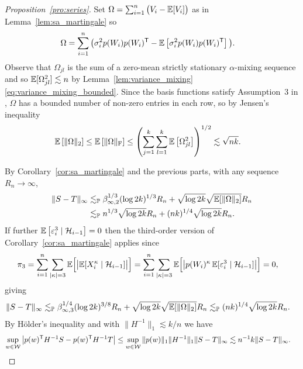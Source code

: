 \begin{proof}[Proposition~\ref{pro:series}]
  Set $\Omega = \sum_{i=1}^n \big(V_i - \mathbb{E}[V_i] \big)$ as in
  Lemma~\ref{lem:sa_martingale} so
  \begin{align*}
    \Omega
    &= \sum_{i=1}^n
    \big(\sigma_i^2 p(W_i)p(W_i)^{\mathsf{T}} - \mathbb{E}\left[ \sigma_i^2 p(W_i)p(W_i)^{\mathsf{T}}
    \right]\big).
  \end{align*}
  Observe that $\Omega_{j l}$ is the sum of a zero-mean
  strictly stationary $\alpha$-mixing sequence and so $\mathbb{E}[\Omega_{j l}^2]
  \lesssim n$ by
  Lemma~\ref{lem:variance_mixing}\ref{eq:variance_mixing_bounded}.
  Since the basis functions
  satisfy Assumption~3 in \citet{cattaneo2020large}, $\Omega$ has a bounded
  number of non-zero entries in each row, so by Jensen's inequality
  \begin{align*}
    \mathbb{E}\left[
      \|\Omega\|_2
    \right]
    &\leq
    \mathbb{E}\left[
      \|\Omega\|_{\mathrm{F}}
    \right]
    \leq
    \left(
      \sum_{j=1}^k
      \sum_{l=1}^k
      \mathbb{E}\left[
        \Omega_{j l}^2
      \right]
    \right)^{1/2}
    \lesssim \sqrt{n k}.
  \end{align*}


  By Corollary~\ref{cor:sa_martingale} and the previous parts,
  with any sequence $R_n \to \infty$,
  \begin{align*}
    \|S  - T \|_\infty
    &\lesssim_{\mathbb{P}}
    \beta_{\infty,2}^{1/3} (\log 2k)^{1/3} R_n
    + \sqrt{\log 2k} \sqrt{\mathbb{E}[\|\Omega\|_2]} R_n \\
    &\lesssim_{\mathbb{P}}
    n^{1/3} \sqrt{\log 2k} R_n
    + (n k)^{1/4} \sqrt{\log 2k} R_n.
  \end{align*}
  If further $\mathbb{E} \left[ \varepsilon_i^3 \mid \mathcal{H}_{i-1} \right] = 0$ then
  the third-order version of Corollary~\ref{cor:sa_martingale}
  applies since
  \begin{align*}
    \pi_3
    &=
    \sum_{i=1}^{n}
    \sum_{|\kappa| = 3}
    \mathbb{E} \Big[ \big|
      \mathbb{E} [ X_i^\kappa \mid \mathcal{H}_{i-1} ]
    \big| \Big]
    =
    \sum_{i=1}^{n}
    \sum_{|\kappa| = 3}
    \mathbb{E} \Big[ \big|
      p(W_i)^\kappa \,
      \mathbb{E} [ \varepsilon_i^3 \mid \mathcal{H}_{i-1} ]
    \big| \Big]
    = 0,
  \end{align*}
  giving
  \begin{align*}
    \|S  - T \|_\infty
    &\lesssim_{\mathbb{P}}
    \beta_{\infty,3}^{1/4} (\log 2k)^{3/8} R_n
    + \sqrt{\log 2k} \sqrt{\mathbb{E}[\|\Omega\|_2]} R_n
    \lesssim_{\mathbb{P}}
    (n k)^{1/4} \sqrt{\log 2k} R_n.
  \end{align*}
  By H{\"o}lder's inequality and with
  $\|H^{-1}\|_1 \lesssim k/n$ we have
  \begin{align*}
    \sup_{w \in \mathcal{W}}
    \left|
    p(w)^{\mathsf{T}} H^{-1} S
    - p(w)^{\mathsf{T}} H^{-1} T
    \right|
    &\leq
    \sup_{w \in \mathcal{W}}
    \|p(w)\|_1
    \|H^{-1}\|_1
    \| S - T \|_\infty
    \lesssim
    n^{-1} k
    \| S - T \|_\infty.
  \end{align*}


\end{proof}
